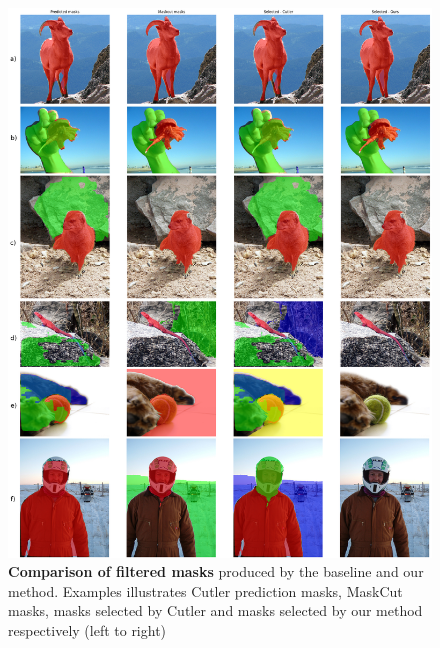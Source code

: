 \begin{figure}
	\centering
	\includegraphics[width=1\textwidth]{Images/main/filtered_mask_comparison.png}
	\caption[\textbf{Mask filtration comparison}]{\textbf{Comparison of filtered masks} produced by the baseline and our method. Examples illustrates Cutler prediction masks, MaskCut masks, masks selected by Cutler and masks selected by our method respectively (left to right)}
	\label{fig:filtered_mask_comparison}
\end{figure}
